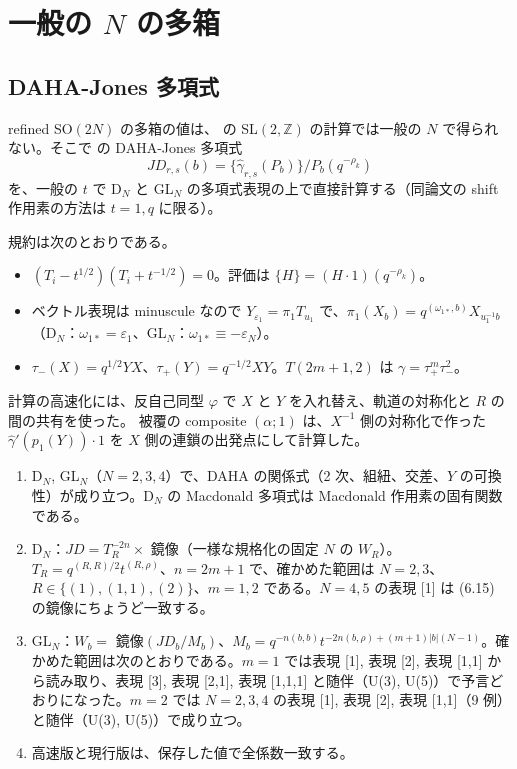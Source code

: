 \section{一般の $N$ の多箱}\label{sec:generalN}

\subsection{DAHA-Jones 多項式}
refined SO$(2N)$ の多箱の値は、\cite{AgSc12} の SL$(2,\mathbb{Z})$ の計算では一般の $N$ で得られない。そこで \cite{Cherednik11} の DAHA-Jones 多項式
\[
JD_{r,s}(b) = \{\hat\gamma_{r,s}(P_b)\}/P_b(q^{-\rho_k})
\]
を、一般の $t$ で D$_N$ と GL$_N$ の多項式表現の上で直接計算する（同論文の shift 作用素の方法は $t = 1, q$ に限る）。

規約は次のとおりである。
\begin{itemize}
\item $(T_i - t^{1/2})(T_i + t^{-1/2}) = 0$。評価は $\{H\} = (H\cdot 1)(q^{-\rho_k})$。
\item ベクトル表現は minuscule なので $Y_{\varepsilon_1} = \pi_1 T_{u_1}$ で、$\pi_1(X_b) = q^{(\omega_{1*}, b)}X_{u_1^{-1}b}$（D$_N$：$\omega_{1*} = \varepsilon_1$、GL$_N$：$\omega_{1*} \equiv -\varepsilon_N$）。
\item $\tau_-(X) = q^{1/2}YX$、$\tau_+(Y) = q^{-1/2}XY$。$T(2m+1, 2)$ は $\gamma = \tau_+^m\tau_-^2$。
\end{itemize}
計算の高速化には、反自己同型 $\varphi$ で $X$ と $Y$ を入れ替え、軌道の対称化と $R$ の間の共有を使った。
被覆の composite $(\alpha;1)$ は、$X^{-1}$ 側の対称化で作った $\hat\gamma'(p_1(Y))\cdot 1$ を $X$ 側の連鎖の出発点にして計算した。

\begin{compresult}[検証]\label{cr:daha}
\begin{enumerate}
\item D$_N$, GL$_N$（$N = 2, 3, 4$）で、DAHA の関係式（2 次、組紐、交差、$Y$ の可換性）が成り立つ。D$_N$ の Macdonald 多項式は Macdonald 作用素の固有関数である。
\item D$_N$：$JD = T_R^{-2n}\times$ 鏡像（一様な規格化の固定 $N$ の $W_R$）。$T_R = q^{(R,R)/2}t^{(R,\rho)}$、$n = 2m+1$ で、確かめた範囲は $N = 2, 3$、$R \in \{(1), (1,1), (2)\}$、$m = 1, 2$ である。$N = 4, 5$ の表現 [1] は \cite{AgSc12} (6.15) の鏡像にちょうど一致する。
\item GL$_N$：$W_b = $ 鏡像$(JD_b/M_b)$、$M_b = q^{-n(b,b)}t^{-2n(b,\rho) + (m+1)|b|(N-1)}$。確かめた範囲は次のとおりである。$m = 1$ では表現 [1], 表現 [2], 表現 [1,1] から読み取り、表現 [3], 表現 [2,1], 表現 [1,1,1] と随伴（U(3), U(5)）で予言どおりになった。$m = 2$ では $N = 2, 3, 4$ の表現 [1], 表現 [2], 表現 [1,1]（9 例）と随伴（U(3), U(5)）で成り立つ。
\item 高速版と現行版は、保存した値で全係数一致する。
\end{enumerate}
\end{compresult}

